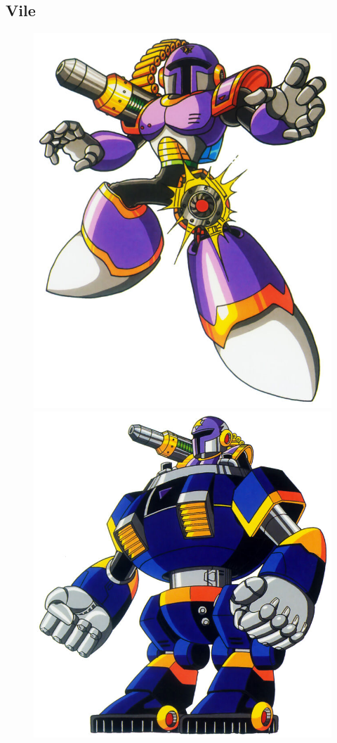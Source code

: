 \subsection{Vile}\label{boss:vile}
\begin{figure}[htp]
	\centering
	\includegraphics[height=\portraitsize]{figures/X1/Sigma_stages/Vile.jpg}
	\includegraphics[height=\portraitsize]{figures/X1/Sigma_stages/VileRideArmor.jpg}

\end{figure}
